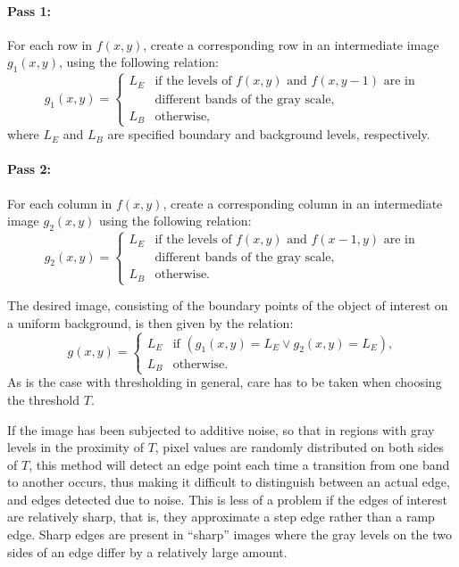 \paragraph{Pass 1:} For each row in $f(x,y)$, create a corresponding
row in an intermediate image $g_{1}(x,y)$, using the following
relation: 
\begin{equation}
  g_{1}(x,y)=\left\{
    \begin{array}{ll}
      L_{E} & \mbox{if the levels of $f(x,y)$ and $f(x,y-1)$ are in} \\
            & \mbox{different bands of the gray scale,} \\
      L_{B} & \mbox{otherwise,}
    \end{array}\right.
\end{equation}
where $L_{E}$ and $L_{B}$ are specified boundary and background
levels, respectively.

\paragraph{Pass 2:} For each column in $f(x,y)$, create a
corresponding column in an intermediate image $g_{2}(x,y)$ using the
following relation:
\begin{equation}
  g_{2}(x,y)=\left\{
    \begin{array}{ll}
      L_{E} & \mbox{if the levels of $f(x,y)$ and $f(x-1,y)$ are in} \\
            & \mbox{different bands of the gray scale,} \\
      L_{B} & \mbox{otherwise.}
    \end{array}\right.
\end{equation}
\vspace*{0.1cm}

\noindent The desired image, consisting of the boundary points of the
object of interest on a uniform background, is then given by the
relation:
\begin{equation}
  g(x,y)=\left\{
    \begin{array}{ll}
      L_{E} & \mbox{if $(g_{1}(x,y)=L_{E}\vee g_{2}(x,y)=L_{E})$,} \\
      L_{B} & \mbox{otherwise.}
    \end{array}\right.
\end{equation}
As is the case with thresholding in general, care has to be taken when
choosing the threshold $T$.  

If the image has been subjected to additive noise, so that in regions
with gray levels in the proximity of $T$, pixel values are randomly
distributed on both sides of $T$, this method will detect an edge
point each time a transition from one band to another occurs, thus
making it difficult to distinguish between an actual edge, and edges
detected due to noise.  This is less of a problem if the edges of
interest are relatively sharp, that is, they approximate a step edge
rather than a ramp edge.  Sharp edges are present in ``sharp'' images
where the gray levels on the two sides of an edge differ by a
relatively large amount.

